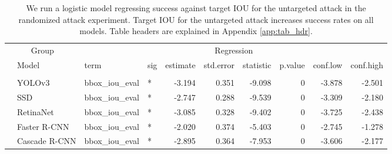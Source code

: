 \documentclass[
]{article}
\begin{document}
\begingroup\fontsize{9}{11}\selectfont

\begin{longtable}[t]{llllrrrrrr}
\caption{\label{tab:untarget_iou_table}We run a logistic model regressing success against target IOU for the untargeted attack in the randomized attack experiment. Target IOU for the untargeted attack increases success rates on all models. Table headers are explained in Appendix \ref{app:tab_hdr}.}\\
\toprule
\multicolumn{2}{c}{Group} & \multicolumn{8}{c}{Regression} \\
\cmidrule(l{3pt}r{3pt}){1-2} \cmidrule(l{3pt}r{3pt}){3-10}
 & Model & term & sig & estimate & std.error & statistic & p.value & conf.low & conf.high\\
\midrule
\addlinespace[0.3em]
\multicolumn{10}{l}{\textbf{Untargeted}}\\
\hspace{1em} & YOLOv3 & bbox\_iou\_eval & * & -3.194 & 0.351 & -9.098 & 0 & -3.878 & -2.501\\
\cmidrule{2-10}\nopagebreak
\hspace{1em} & SSD & bbox\_iou\_eval & * & -2.747 & 0.288 & -9.539 & 0 & -3.309 & -2.180\\
\cmidrule{2-10}\nopagebreak
\hspace{1em} & RetinaNet & bbox\_iou\_eval & * & -3.085 & 0.328 & -9.402 & 0 & -3.725 & -2.438\\
\cmidrule{2-10}\nopagebreak
\hspace{1em} & Faster R-CNN & bbox\_iou\_eval & * & -2.020 & 0.374 & -5.403 & 0 & -2.745 & -1.278\\
\cmidrule{2-10}\nopagebreak
\hspace{1em} & Cascade R-CNN & bbox\_iou\_eval & * & -2.895 & 0.364 & -7.953 & 0 & -3.606 & -2.177\\
\bottomrule
\end{longtable}
\endgroup{}
\end{document}
